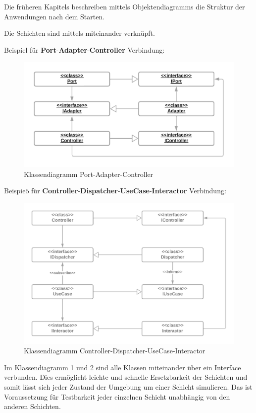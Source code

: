Die früheren Kapitels beschreiben mittels Objektendiagramms die Struktur der Anwendungen nach dem Starten.

Die Schichten sind mittels \textbf{} miteinander verknüpft.

Beispiel für \textbf{Port}-\textbf{Adapter}-\textbf{Controller} Verbindung:

\begin{figure}[H]
    \centering
    \includegraphics[width=12cm]{./images/Klassendiagramm Port-Adapter.png}
    \caption[Klassendiagramm Port-Adapter-Controller]{Klassendiagramm Port-Adapter-Controller \footnotemark}
    \label{fig:FullCDPAC}
\end{figure}

Beispieö für \textbf{Controller}-\textbf{Dispatcher}-\textbf{UseCase}-\textbf{Interactor} Verbindung:
\begin{figure}[H]
    \centering
    \includegraphics[width=12cm]{./images/CDUI-Klassendiagramm.png}
    \caption[Klassendiagramm Controller-Dispatcher-UseCase-Interactor]{Klassendiagramm Controller-Dispatcher-UseCase-Interactor \footnotemark}
    \label{fig:FullCDCDUI}
\end{figure}

Im Klassendiagramm \ref{fig:FullCDPAC} und \ref{fig:FullCDCDUI} sind alle Klassen miteinander über ein Interface verbunden.
Dies ermöglicht leichte und schnelle Ersetzbarkeit der Schichten und 
somit lässt sich jeder Zustand der Umgebung um einer Schicht simulieren. 
Das ist Voraussetzung für Testbarkeit jeder einzelnen Schicht unabhängig von den anderen Schichten.